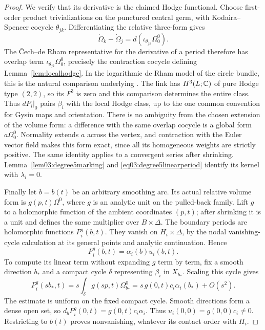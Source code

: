 \begin{proof}
We verify that its derivative is the claimed Hodge functional.
Choose first-order product trivializations on the punctured
central germ, with Kodaira--Spencer cocycle $\theta_{jk}$.
Differentiating the relative three-form gives
\[
 \dot\Omega_k-\dot\Omega_j
       =d(\iota_{\theta_{jk}}\Omega_0^0).
\]
The \v{C}ech--de Rham representative for the derivative of a
period therefore has overlap term
$\iota_{\theta_{jk}}\Omega_0^0$, precisely the contraction
cocycle defining Lemma~\ref{lem:localhodge}.
In the logarithmic de Rham model of the circle bundle, this is
the natural comparison underlying \cite[Theorem~2.1(vi)]{FL22a}.
The link has $H^3(L;\mathbb{C})$ of pure Hodge type $(2,2)$, so its
$F^3$ is zero and this comparison determines the entire class.
Thus $dP_i|_0$ pairs $\beta_i$ with the local Hodge class,
up to the one common convention for Gysin maps and orientation.
There is no ambiguity from the chosen extension of the volume
form: a difference with the same overlap cocycle is a global
form $a\Omega_0^0$.  Normality extends $a$ across the vertex,
and contraction with the Euler vector field makes this form
exact, since all its homogeneous weights are strictly positive.
The same identity applies to a convergent series after shrinking.
Lemma~\ref{lem03:degree5marking} and
\eqref{eq03:degree5linearperiod} identify its kernel with
$\lambda_i=0$.

Finally let $b=b(t)$ be an arbitrary smoothing arc.  Its actual
relative volume form is $g(p,t)\Omega^0$, where $g$ is an
analytic unit on the pulled-back family.  Lift $g$ to a holomorphic
function of the ambient coordinates $(p,t)$; after shrinking it
is a unit and defines the same multiplier over $B\times\Delta$.
The boundary periods are holomorphic functions $P_i^g(b,t)$.
They vanish on $H_i\times\Delta$, by the nodal vanishing-cycle
calculation at its general points and analytic continuation.
Hence
\[
 P_i^g(b,t)=\alpha_i(b)u_i(b,t).
\]
To compute its linear term without expanding $g$ term by term,
fix a smooth direction $b_*$ and a compact cycle $\delta$
representing $\beta_i$ in $X_{b_*}$.  Scaling this cycle gives
\[
 P_i^g(sb_*,t)
 =s\int_\delta g(sp,t)\Omega_{b_*}^0
 =s\,g(0,t)c_i\alpha_i(b_*)+O(s^2).
\]
The estimate is uniform on the fixed compact cycle.  Smooth
directions form a dense open set, so
$d_bP_i^g(0,t)=g(0,t)c_i\alpha_i$.  Thus
$u_i(0,0)=g(0,0)c_i\ne0$.  Restricting to $b(t)$ proves
nonvanishing, whatever its contact order with $H_i$.
\end{proof}
